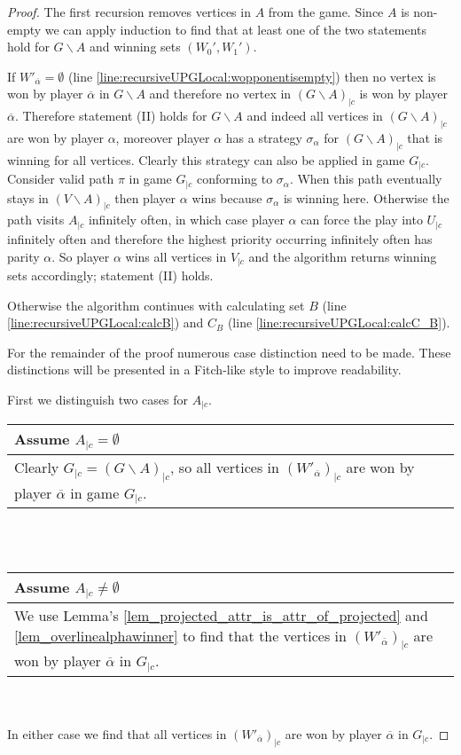 \begin{theorem}
\begin{proof}
		The first recursion removes vertices in $A$ from the game. Since $A$ is non-empty we can apply induction to find that at least one of the two statements hold for $G\backslash A$ and winning sets $(W_0',W_1')$.
		
		If $W'_{\overline{\alpha}} = \emptyset$ (line \ref{line:recursiveUPGLocal:wopponentisempty}) then no vertex is won by player $\overline{\alpha}$ in $G\backslash A$ and therefore no vertex in $(G\backslash A)_{|c}$ is won by player $\overline{\alpha}$. Therefore statement (II) holds for $G\backslash A$ and indeed all vertices in $(G\backslash A)_{|c}$ are won by player $\alpha$, moreover player $\alpha$ has a strategy $\sigma_\alpha$ for $(G\backslash A)_{|c}$ that is winning for all vertices. Clearly this strategy can also be applied in game $G_{|c}$. Consider valid path $\pi$ in game $G_{|c}$ conforming to $\sigma_\alpha$. When this path eventually stays in $(V \backslash A)_{|c}$ then player $\alpha$ wins because $\sigma_\alpha$ is winning here. Otherwise the path visits $A_{|c}$ infinitely often, in which case player $\alpha$ can force the play into $U_{|c}$ infinitely often and therefore the highest priority occurring infinitely often has parity $\alpha$. So player $\alpha$ wins all vertices in $V_{|c}$ and the algorithm returns winning sets accordingly; statement (II) holds.
		
		Otherwise the algorithm continues with calculating set $B$ (line \ref{line:recursiveUPGLocal:calcB}) and $C_B$ (line \ref{line:recursiveUPGLocal:calcC_B}).
		
		For the remainder of the proof numerous case distinction need to be made. These distinctions will be presented in a Fitch-like style to improve readability.
		
		First we distinguish two cases for $A_{|c}$.
		
		\begin{tabular}{|p{14.2cm}}
			Assume $A_{|c} = \emptyset$\\
			\hline
			Clearly $G_{|c} = (G\backslash A)_{|c}$, so all vertices in $(W'_{\overline{\alpha}})_{|c}$ are won by player $\overline{\alpha}$ in game $G_{|c}$.
		\end{tabular}\\\\
		\begin{tabular}{|p{14.2cm}}
			Assume $A_{|c} \neq \emptyset$\\
			\hline
			We use Lemma's \ref{lem_projected_attr_is_attr_of_projected} and \ref{lem_overlinealphawinner} to find that the vertices in $(W'_{\overline{\alpha}})_{|c}$ are won by player $\overline{\alpha}$ in $G_{|c}$.
		\end{tabular}\\\\
		In either case we find that all vertices in $(W'_{\overline{\alpha}})_{|c}$ are won by player $\overline{\alpha}$ in $G_{|c}$.
		

\end{proof}
\end{theorem}
